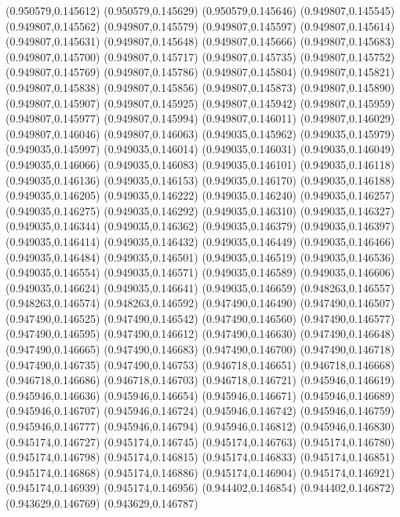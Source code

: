 (0.950579,0.145612)
(0.950579,0.145629)
(0.950579,0.145646)
(0.949807,0.145545)
(0.949807,0.145562)
(0.949807,0.145579)
(0.949807,0.145597)
(0.949807,0.145614)
(0.949807,0.145631)
(0.949807,0.145648)
(0.949807,0.145666)
(0.949807,0.145683)
(0.949807,0.145700)
(0.949807,0.145717)
(0.949807,0.145735)
(0.949807,0.145752)
(0.949807,0.145769)
(0.949807,0.145786)
(0.949807,0.145804)
(0.949807,0.145821)
(0.949807,0.145838)
(0.949807,0.145856)
(0.949807,0.145873)
(0.949807,0.145890)
(0.949807,0.145907)
(0.949807,0.145925)
(0.949807,0.145942)
(0.949807,0.145959)
(0.949807,0.145977)
(0.949807,0.145994)
(0.949807,0.146011)
(0.949807,0.146029)
(0.949807,0.146046)
(0.949807,0.146063)
(0.949035,0.145962)
(0.949035,0.145979)
(0.949035,0.145997)
(0.949035,0.146014)
(0.949035,0.146031)
(0.949035,0.146049)
(0.949035,0.146066)
(0.949035,0.146083)
(0.949035,0.146101)
(0.949035,0.146118)
(0.949035,0.146136)
(0.949035,0.146153)
(0.949035,0.146170)
(0.949035,0.146188)
(0.949035,0.146205)
(0.949035,0.146222)
(0.949035,0.146240)
(0.949035,0.146257)
(0.949035,0.146275)
(0.949035,0.146292)
(0.949035,0.146310)
(0.949035,0.146327)
(0.949035,0.146344)
(0.949035,0.146362)
(0.949035,0.146379)
(0.949035,0.146397)
(0.949035,0.146414)
(0.949035,0.146432)
(0.949035,0.146449)
(0.949035,0.146466)
(0.949035,0.146484)
(0.949035,0.146501)
(0.949035,0.146519)
(0.949035,0.146536)
(0.949035,0.146554)
(0.949035,0.146571)
(0.949035,0.146589)
(0.949035,0.146606)
(0.949035,0.146624)
(0.949035,0.146641)
(0.949035,0.146659)
(0.948263,0.146557)
(0.948263,0.146574)
(0.948263,0.146592)
(0.947490,0.146490)
(0.947490,0.146507)
(0.947490,0.146525)
(0.947490,0.146542)
(0.947490,0.146560)
(0.947490,0.146577)
(0.947490,0.146595)
(0.947490,0.146612)
(0.947490,0.146630)
(0.947490,0.146648)
(0.947490,0.146665)
(0.947490,0.146683)
(0.947490,0.146700)
(0.947490,0.146718)
(0.947490,0.146735)
(0.947490,0.146753)
(0.946718,0.146651)
(0.946718,0.146668)
(0.946718,0.146686)
(0.946718,0.146703)
(0.946718,0.146721)
(0.945946,0.146619)
(0.945946,0.146636)
(0.945946,0.146654)
(0.945946,0.146671)
(0.945946,0.146689)
(0.945946,0.146707)
(0.945946,0.146724)
(0.945946,0.146742)
(0.945946,0.146759)
(0.945946,0.146777)
(0.945946,0.146794)
(0.945946,0.146812)
(0.945946,0.146830)
(0.945174,0.146727)
(0.945174,0.146745)
(0.945174,0.146763)
(0.945174,0.146780)
(0.945174,0.146798)
(0.945174,0.146815)
(0.945174,0.146833)
(0.945174,0.146851)
(0.945174,0.146868)
(0.945174,0.146886)
(0.945174,0.146904)
(0.945174,0.146921)
(0.945174,0.146939)
(0.945174,0.146956)
(0.944402,0.146854)
(0.944402,0.146872)
(0.943629,0.146769)
(0.943629,0.146787)
